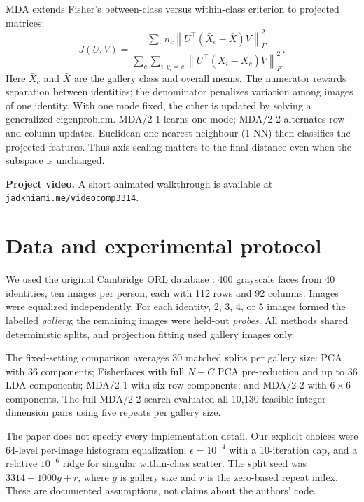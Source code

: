 \documentclass{article}
\begin{document}
MDA extends Fisher's between-class versus within-class criterion to projected matrices:
\begin{equation}
J(U,V)=
\frac{\sum_c n_c\left\|U^\top(\bar X_c-\bar X)V\right\|_F^2}
{\sum_c\sum_{i:y_i=c}\left\|U^\top(X_i-\bar X_c)V\right\|_F^2}.
\label{eq:dtc}
\end{equation}
Here $\bar X_c$ and $\bar X$ are the gallery class and overall means. The numerator rewards separation between identities; the denominator penalizes variation among images of one identity. With one mode fixed, the other is updated by solving a generalized eigenproblem. MDA/2-1 learns one mode; MDA/2-2 alternates row and column updates. Euclidean one-nearest-neighbour (1-NN) then classifies the projected features. Thus axis scaling matters to the final distance even when the subspace is unchanged.

\noindent\textbf{Project video.} A short animated walkthrough is available at \href{https://jadkhiami.me/videocomp3314}{\texttt{jadkhiami.me/videocomp3314}}.

\section{Data and experimental protocol}
We used the original Cambridge ORL database \citep{ORL}: 400 grayscale faces from 40 identities, ten images per person, each with 112 rows and 92 columns. Images were equalized independently. For each identity, 2, 3, 4, or 5 images formed the labelled \emph{gallery}; the remaining images were held-out \emph{probes}. All methods shared deterministic splits, and projection fitting used gallery images only.

The fixed-setting comparison averages 30 matched splits per gallery size: PCA with 36 components; Fisherfaces with full $N-C$ PCA pre-reduction and up to 36 LDA components; MDA/2-1 with six row components; and MDA/2-2 with $6\times6$ components. The full MDA/2-2 search evaluated all 10,130 feasible integer dimension pairs using five repeats per gallery size.

The paper does not specify every implementation detail. Our explicit choices were 64-level per-image histogram equalization, $\epsilon=10^{-4}$ with a 10-iteration cap, and a relative $10^{-6}$ ridge for singular within-class scatter. The split seed was $3314+1000g+r$, where $g$ is gallery size and $r$ is the zero-based repeat index. These are documented assumptions, not claims about the authors' code.
\end{document}
